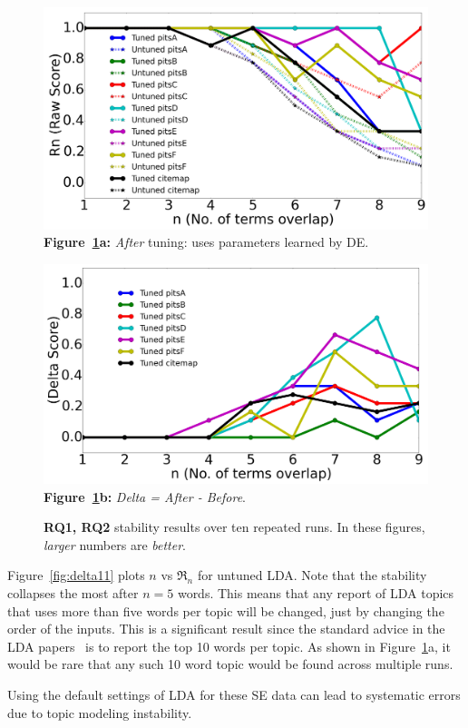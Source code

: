 \documentclass[twocolumn,5p,sort&compress]{elsarticle}
\theoremstyle{break}
\begin{document}
\begin{figure}[!t]
        \begin{center}
        \includegraphics[width=0.9\linewidth]{./fig/raw_graph.png}
  \footnotesize{{\bf Figure~\ref{fig:delta}a:}  {\em After} tuning: uses parameters learned by DE.}

        \includegraphics[width=0.9\linewidth]{./fig/tuned_delta_vem.png}
  \footnotesize{{\bf Figure~\ref{fig:delta}b:}  {\em Delta = After - Before}.}
  \end{center}
    \caption{{\bf RQ1, RQ2} stability results over ten repeated runs. In these figures, {\em larger} numbers
    are {\em better}.}\label{fig:delta}
\end{figure}

Figure~\ref{fig:delta11}   plots $n$ vs $\Re_n$ for untuned  LDA.
Note that the  stability collapses the most after $n=5$ words. This means
  that any report of LDA topics that uses more than five words per topic will
  be changed, just by changing the order of the inputs. This is a significant result
  since the standard advice in the LDA papers~\cite{panichella2013effectively, lukins2010bug}
  is to report the top 10 words per topic. As shown in Figure~\ref{fig:delta}a, it would
  be rare that any such 10 word topic would be found across multiple runs.
 \begin{lesson}
  Using the default settings of LDA for these SE data can lead to systematic errors due to topic
  modeling instability. 
\end{lesson}
\end{document}
